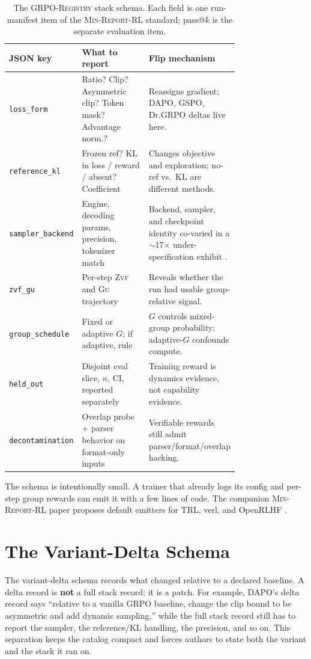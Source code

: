 \documentclass[11pt]{article}
\newcommand{\zvf}{\textsc{Zvf}}
\newcommand{\gu}{\textsc{Gu}}
\newcommand{\minreport}{\textsc{Min-Report-RL}}
\newcommand{\grpo}{\textsc{GRPO}}
\newcommand{\grpoReg}{\textsc{GRPO-Registry}}
\begin{document}
\begin{table}[t]
\centering
\caption{The \grpoReg{} stack schema. Each field is one run-manifest item of
  the \minreport{} standard; pass@$k$ is the separate evaluation item.}
\label{tab:stack-schema}
\small
\begin{tabular}{@{}lp{0.40\linewidth}p{0.36\linewidth}@{}}
\toprule
\textbf{JSON key} & \textbf{What to report} & \textbf{Flip mechanism}\\
\midrule
\texttt{loss\_form} & Ratio? Clip? Asymmetric clip? Token mask? Advantage norm.?
  & Reassigns gradient; DAPO, GSPO, Dr.\grpo{} deltas live here.\\
\texttt{reference\_kl} & Frozen ref? KL in loss / reward / absent? Coefficient &
  Changes objective and exploration; no-ref vs.\ KL are different methods.\\
\texttt{sampler\_backend} & Engine, decoding params, precision, tokenizer match &
  Backend, sampler, and checkpoint identity co-varied in a $\sim$17$\times$
  under-specification exhibit \cite{zvfaudit2026}.\\
\texttt{zvf\_gu} & Per-step \zvf{} and \gu{} trajectory &
  Reveals whether the run had usable group-relative signal.\\
\texttt{group\_schedule} & Fixed or adaptive $G$; if adaptive, rule &
  $G$ controls mixed-group probability; adaptive-$G$ confounds compute.\\
\texttt{held\_out} & Disjoint eval slice, $n$, CI, reported separately &
  Training reward is dynamics evidence, not capability evidence.\\
\texttt{decontamination} & Overlap probe + parser behavior on format-only inputs &
  Verifiable rewards still admit parser/format/overlap hacking.\\
\bottomrule
\end{tabular}
\end{table}

The schema is intentionally small. A trainer that already logs its config and
per-step group rewards can emit it with a few lines of code. The companion
\minreport{} paper proposes default emitters for TRL, verl, and OpenRLHF
\cite{minreportrl2026}.

\section{The Variant-Delta Schema}
\label{sec:delta-schema}


The variant-delta schema records what changed relative to a declared baseline.
A delta record is \textbf{not} a full stack record; it is a patch. For example,
DAPO's delta record says ``relative to a vanilla \grpo{} baseline, change the
clip bound to be asymmetric and add dynamic sampling,'' while the full stack
record still has to report the sampler, the reference/KL handling, the
precision, and so on. This separation keeps the catalog compact and forces
authors to state both the variant and the stack it ran on.
\end{document}
